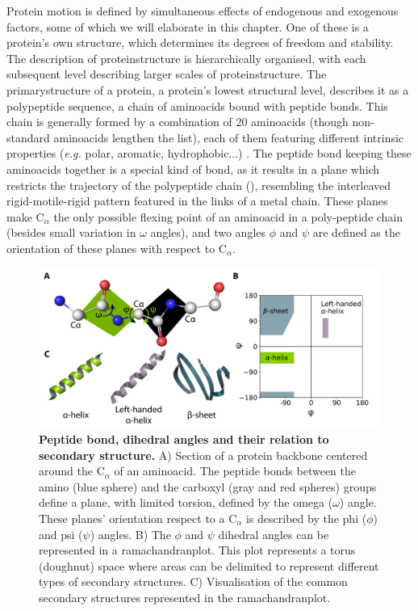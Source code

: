 Protein motion is defined by simultaneous effects of endogenous and exogenous factors, some of which we will elaborate in this chapter. One of these is a protein's own structure, which determines its degrees of freedom and stability. The description of \gls{proteinstructure} is hierarchically organised, with each subsequent level describing larger scales of \gls{proteinstructure}. The \gls{primarystructure} of a protein, a protein's lowest structural level, describes it as a polypeptide sequence, a chain of \glspl{aminoacid} bound with peptide bonds. This chain is generally formed by a combination of 20 \glspl{aminoacid} (though non-standard \glspl{aminoacid} lengthen the list), each of them featuring different intrinsic properties (\textit{e.g.} polar, aromatic, hydrophobic...) \cite{neilan_amino_2003}. The peptide bond keeping these \glspl{aminoacid} together is a special kind of bond, as it results in a plane which restricts the trajectory of the polypeptide chain (), resembling the interleaved rigid-motile-rigid pattern featured in the links of a metal chain. These planes make $\text{C}_{\alpha}$ the only possible flexing point of an \gls{aminoacid} in a poly-peptide chain (besides small variation in $\omega$ angles), and two angles $\phi$ and $\psi$ are defined as the orientation of these planes with respect to $\text{C}_{\alpha}$. 

\begin{figure}[tbh]
    \centering
    \includegraphics[width=1\linewidth]{figures/peptide_bond_rama.pdf}
    \caption{\textbf{Peptide bond, dihedral angles and their relation to secondary structure.} A) Section of a protein \gls{backbone} centered around the $\text{C}_{\alpha}$ of an \gls{aminoacid}. The peptide bonds between the amino (blue sphere) and the carboxyl (gray and red spheres) groups define a plane, with limited torsion, defined by the omega ($\omega$) angle. These planes' orientation respect to a $\text{C}_{\alpha}$ is described by the phi ($\phi$) and psi ($\psi$) angles. B) The $\phi$ and $\psi$ dihedral angles can be represented in a \gls{ramachandranplot}. This plot represents a torus (doughnut) space where areas can be delimited to represent different types of secondary structures. C) Visualisation of the common secondary structures represented in the \gls{ramachandranplot}.}
    \label{fig:chapter1:peptide_bond}
\end{figure}
 

